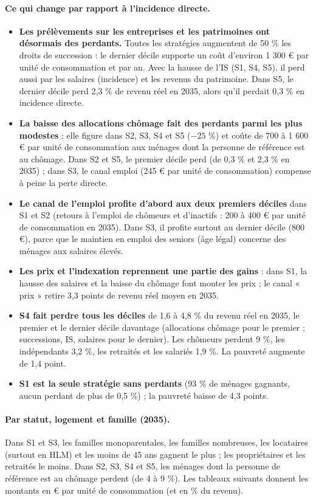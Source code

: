 \paragraph{Ce qui change par rapport à l'incidence directe.}
\begin{itemize}
\item \textbf{Les prélèvements sur les entreprises et les patrimoines ont désormais des perdants.} Toutes les stratégies
augmentent de 50 \% les droits de succession : le dernier décile supporte un coût d'environ 1 300 € par unité de
consommation et par an. Avec la hausse de l'IS (S1, S4, S5), il perd aussi par les salaires (incidence) et les revenus
du patrimoine. Dans S5, le dernier décile perd 2,3 \% de revenu réel en 2035, alors qu'il perdait 0,3 \% en incidence
directe.
\item \textbf{La baisse des allocations chômage fait des perdants parmi les plus modestes} : elle figure dans S2, S3, S4
et S5 ($-25$ \%) et coûte de 700 à 1 600 € par unité de consommation aux ménages dont la personne de référence est au
chômage. Dans S2 et S5, le premier décile perd (de 0,3 \% et 2,3 \% en 2035) ; dans S3, le canal emploi (245 € par unité
de consommation) compense à peine la perte directe.
\item \textbf{Le canal de l'emploi profite d'abord aux deux premiers déciles} dans S1 et S2 (retours à l'emploi de
chômeurs et d'inactifs : 200 à 400 € par unité de consommation en 2035). Dans S3, il profite surtout au dernier décile
(800 €), parce que le maintien en emploi des seniors (âge légal) concerne des ménages aux salaires élevés.
\item \textbf{Les prix et l'indexation reprennent une partie des gains} : dans S1, la hausse des salaires et la baisse du
chômage font monter les prix ; le canal « prix » retire 3,3 points de revenu réel moyen en 2035.
\item \textbf{S4 fait perdre tous les déciles} de 1,6 à 4,8 \% du revenu réel en 2035, le premier et le dernier décile
davantage (allocations chômage pour le premier ; successions, IS, salaires pour le dernier). Les chômeurs perdent 9 \%,
les indépendants 3,2 \%, les retraités et les salariés 1,9 \%. La pauvreté augmente de 1,4 point.
\item \textbf{S1 est la seule stratégie sans perdants} (93 \% de ménages gagnants, aucun perdant de plus de 0,5 \%) ;
la pauvreté baisse de 4,3 points.
\end{itemize}

\paragraph{Par statut, logement et famille (2035).} Dans S1 et S3, les familles monoparentales, les familles
nombreuses, les locataires (surtout en HLM) et les moins de 45 ans gagnent le plus ; les propriétaires et les retraités
le moins. Dans S2, S3, S4 et S5, les ménages dont la personne de référence est au chômage perdent (de 4 à 9 \%). Les
tableaux suivants donnent les montants en € par unité de consommation (et en \% du revenu).

